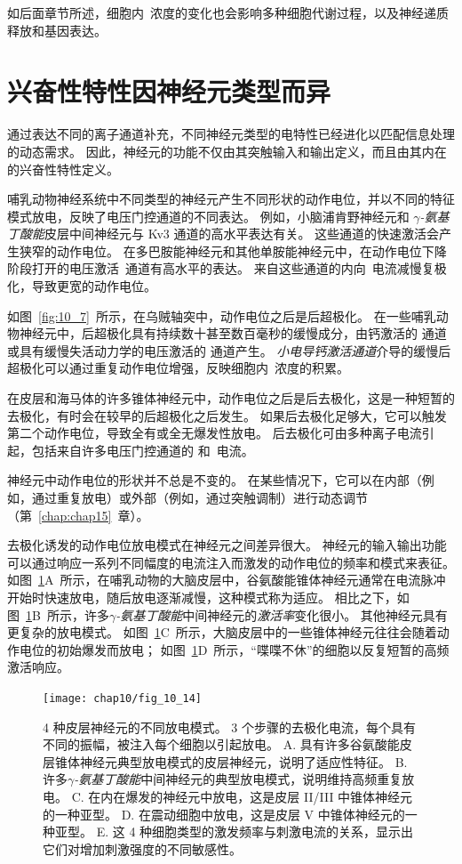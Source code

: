 如后面章节所述，细胞内~浓度的变化也会影响多种细胞代谢过程，以及神经递质释放和基因表达。



\section{兴奋性特性因神经元类型而异}

通过表达不同的离子通道补充，不同神经元类型的电特性已经进化以匹配信息处理的动态需求。
因此，神经元的功能不仅由其突触输入和输出定义，而且由其内在的兴奋性特性定义。


哺乳动物神经系统中不同类型的神经元产生不同形状的动作电位，并以不同的特征模式放电，反映了电压门控通道的不同表达。
例如，小脑浦肯野神经元和 \textit{$\gamma$-氨基丁酸能}皮层中间神经元与 Kv3 通道的高水平表达有关。
这些通道的快速激活会产生狭窄的动作电位。
在多巴胺能神经元和其他单胺能神经元中，在动作电位下降阶段打开的电压激活~通道有高水平的表达。
来自这些通道的内向~电流减慢复极化，导致更宽的动作电位。


如图~\ref{fig:10_7}~所示，在乌贼轴突中，动作电位之后是后超极化。
在一些哺乳动物神经元中，后超极化具有持续数十甚至数百毫秒的缓慢成分，由钙激活的  通道或具有缓慢失活动力学的电压激活的  通道产生。
\textit{小电导钙激活通道}介导的缓慢后超极化可以通过重复动作电位增强，反映细胞内~浓度的积累。


在皮层和海马体的许多锥体神经元中，动作电位之后是后去极化，这是一种短暂的去极化，有时会在较早的后超极化之后发生。
如果后去极化足够大，它可以触发第二个动作电位，导致全有或全无爆发性放电。
后去极化可由多种离子电流引起，包括来自许多电压门控通道的  和~电流。


神经元中动作电位的形状并不总是不变的。
在某些情况下，它可以在内部（例如，通过重复放电）或外部（例如，通过突触调制）进行动态调节（第~\ref{chap:chap15}~章）。


去极化诱发的动作电位放电模式在神经元之间差异很大。 
神经元的输入输出功能可以通过响应一系列不同幅度的电流注入而激发的动作电位的频率和模式来表征。
如图~\ref{fig:10_14}A~所示，在哺乳动物的大脑皮层中，谷氨酸能锥体神经元通常在电流脉冲开始时快速放电，随后放电逐渐减慢，这种模式称为适应。
相比之下，如图~\ref{fig:10_14}B~所示，许多\textit{$\gamma$-氨基丁酸能}中间神经元的\textit{激活率}变化很小。
其他神经元具有更复杂的放电模式。
如图~\ref{fig:10_14}C~所示，大脑皮层中的一些锥体神经元往往会随着动作电位的初始爆发而放电；
如图~\ref{fig:10_14}D~所示，“喋喋不休”的细胞以反复短暂的高频激活响应。


\begin{figure}[htbp]
	\centering
	\texttt{[image: chap10/fig\_10\_14]}
	\caption{4 种皮层神经元的不同放电模式。
		3 个步骤的去极化电流，每个具有不同的振幅，被注入每个细胞以引起放电\cite{nowak2003electrophysiological}。
		A. 具有许多谷氨酸能皮层锥体神经元典型放电模式的皮层神经元，说明了适应性特征。
		B. 许多\textit{$\gamma$-氨基丁酸能}中间神经元的典型放电模式，说明维持高频重复放电。
		C. 在内在爆发的神经元中放电，这是皮层 II/III 中锥体神经元的一种亚型。
		D. 在震动细胞中放电，这是皮层 V 中锥体神经元的一种亚型。
		E. 这 4 种细胞类型的激发频率与刺激电流的关系，显示出它们对增加刺激强度的不同敏感性。}
	\label{fig:10_14}
\end{figure}


